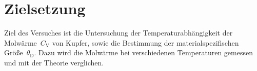 \section{Zielsetzung}
\label{sec:zielsetzung}
%
Ziel des Versuches ist die Untersuchung der Temperaturabhängigkeit der
Molwärme~$C_{\mathrm{V}}$ von Kupfer, sowie die Bestimmung der
materialspezifischen Größe~$\theta_{\mathrm{D}}$. Dazu wird die Molwärme bei
verschiedenen Temperaturen gemessen und mit der Theorie verglichen.
